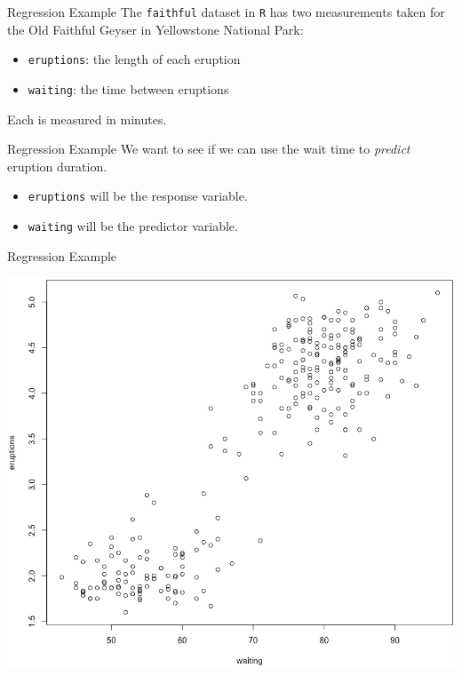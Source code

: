 \begin{frame}{Regression Example}
    The \texttt{faithful} dataset in \texttt{R} has two measurements taken for the Old Faithful Geyser in Yellowstone National Park:
    \begin{itemize}
        \item \texttt{eruptions}: the length of each eruption
        \item \texttt{waiting}: the time between eruptions
    \end{itemize}
    Each is measured in minutes.
\end{frame}

\begin{frame}{Regression Example}
    We want to see if we can use the wait time to \textit{predict} eruption duration.
    \begin{itemize}
        \item \texttt{eruptions} will be the response variable.
        \item \texttt{waiting} will be the predictor variable.
    \end{itemize}
\end{frame}

\begin{frame}{Regression Example}
    \begin{center}
        \includegraphics[scale=0.25]{images/geyserscatter.png}
    \end{center}
\end{frame}

